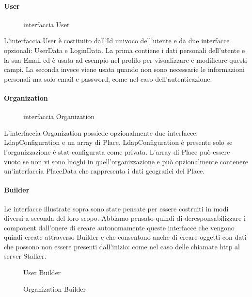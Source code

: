 \documentclass[../../manuale-manutentore.tex]{subfiles}
\begin{document}
\paragraph{User}%
\label{par:user}
\begin{figure}[H]
  \centering
  \caption{interfaccia User}%
  \label{fig:web-app-user}
\end{figure}
L'interfaccia User è costituito dall'Id univoco dell'utente e da due interfacce opzionali: UserData e LoginData.
La prima contiene i dati personali dell'utente e la sua Email ed è usata ad esempio nel profilo per visualizzare e modificare questi campi.
La seconda invece viene usata quando non sono necessarie le informazioni personali ma solo email e password, come nel caso dell'autenticazione.

\paragraph{Organization}%
\label{par:organization}
\begin{figure}[H]
  \centering
  \caption{interfaccia Organization}%
  \label{fig:web-app-organization}
\end{figure}
L'interfaccia Organization possiede opzionalmente due interfacce: LdapConfiguration e un array di Place.
LdapConfiguration è presente solo se l'organizzazione è stat configurata come privata.
L'array di Place può essere vuoto se non vi sono luoghi in quell'organizzazione e può opzionalmente contenere un'interfaccia PlaceData che rappresenta i dati geografici del Place.

\paragraph{Builder}%
\label{par:builder}
Le interfacce illustrate sopra sono state pensate per essere costruiti in modi diversi a seconda del loro scopo.
Abbiamo pensato quindi di deresponsabilizzare i component dall'onere di creare autonomamente queste interfacce che vengono quindi create attraverso Builder e che consentono anche di creare oggetti con dati che possono non essere presenti dall'inizio: come nel caso delle chiamate http al server Stalker.
\begin{figure}[H]
  \centering
  \caption{User Builder}%
  \label{fig:web-app-user-builder}
\end{figure}
\begin{figure}[H]
  \centering
  \caption{Organization Builder}%
  \label{fig:web-app-organization-builder}
\end{figure}
\end{document}
